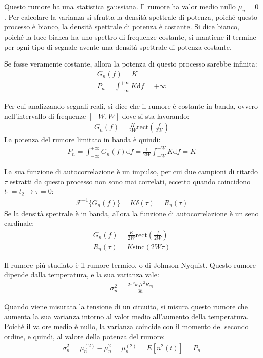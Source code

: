 \documentclass{article}
\newcommand{\rect}{\mathrm{rect}}
\newcommand{\sinc}{\mathrm{sinc}}
\newcommand{\df}{\mathrm{d}}
\numberwithin{equation}{subsection}
\begin{document}
Questo rumore ha una statistica gaussiana. Il rumore ha valor medio nullo $\mu_n=0$. 
Per calcolare la varianza si sfrutta la densità spettrale di potenza, poiché questo processo è bianco, la densità spettrale di potenza è costante. 
Si dice bianco, poiché la luce bianca ha uno spettro di frequenze costante, si mantiene il termine per ogni tipo di segnale avente una densità spettrale di potenza 
costante. 

Se fosse veramente costante, allora la potenza di questo processo sarebbe infinita:
\begin{gather*}
    G_n(f)=K\\
    P_n=\displaystyle\int_{-\infty}^{+\infty}K\df f=+\infty
\end{gather*}

Per cui analizzando segnali reali, si dice che il rumore è costante in banda, ovvero nell'intervallo di frequenze $[-W,W]$ dove si sta lavorando:
\begin{gather*}
    G_n(f)=\displaystyle\frac{K}{2W}\rect\left(\frac{f}{2W}\right)
\end{gather*}
La potenza del rumore limitato in banda è quindi:
\begin{gather*}
    P_n=\displaystyle\int_{-\infty}^{+\infty}G_n(f)\df f=\frac{1}{2W}\int_{-W}^{+W}K\df f=K
\end{gather*}


La sua funzione di autocorrelazione è un impulso, per cui due campioni di ritardo $\tau$ estratti da questo processo non sono mai correlati, eccetto quando coincidono
$t_1=t_2\to \tau=0$:
\begin{gather*}
    \mathscr{F}^{-1}\{G_n(f)\}=K\delta(\tau)=R_n(\tau)
\end{gather*}
Se la densità spettrale è in banda, allora la funzione di autocorrelazione è un seno cardinale:
\begin{gather*}
    G_n(f)=\displaystyle\frac{K}{2W}\rect\left(\frac{f}{2W}\right)\\
    R_n(\tau)=K\sinc(2W\tau)
\end{gather*}

Il rumore più studiato è il rumore termico, o di Johnson-Nyquist. Questo rumore dipende dalla temperatura, e la sua varianza vale:
\begin{gather*}
    \sigma_n^2=\displaystyle\frac{2\pi^2k_\mathrm{B}T^2R_\mathrm{eq}}{3\hbar}
\end{gather*}

Quando viene misurata la tensione di un circuito, si misura questo rumore che aumenta la sua varianza intorno al valor medio all'aumento della temperatura. 
Poiché il valore medio è nullo, la varianza coincide con il momento del secondo ordine, e quindi, al valore della potenza del rumore:
\begin{gather*}
    \sigma_n^2=\mu_n^{(2)}-\mu_n^2=\mu_n^{(2)}=E[n^2(t)]=P_n
\end{gather*}
\end{document}
